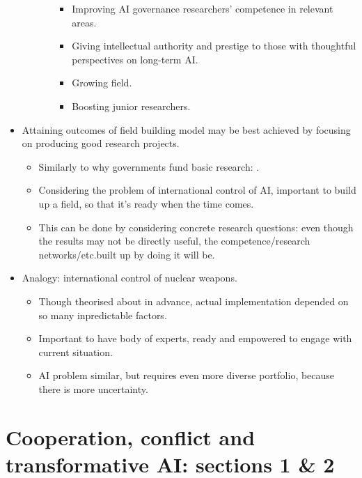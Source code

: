 \begin{itemize}
\begin{itemize}
\begin{itemize}
\begin{itemize}
                \item Improving AI governance researchers' competence in relevant areas.
                \item Giving intellectual authority and prestige to those with thoughtful perspectives on long-term AI.
                \item Growing field.
                \item Boosting junior researchers.
            \end{itemize}
        \end{itemize}
    \end{itemize}
    \item Attaining outcomes of field building model may be best achieved by focusing on producing good research projects.
    \begin{itemize}
        \item Similarly to why governments fund basic research: .
        \item Considering the problem of international control of AI, important to build up a field, so that it's ready when the time comes.
        \item This can be done by considering concrete research questions: even though the results may not be directly useful, the competence/research networks/etc.\@ built up by doing it will be.
    \end{itemize}
    \item Analogy: international control of nuclear weapons.
    \begin{itemize}
        \item Though theorised about in advance, actual implementation depended on so many inpredictable factors.
        \item Important to have body of experts, ready and empowered to engage with current situation.
        \item AI problem similar, but requires even more diverse portfolio, because there is more uncertainty.
    \end{itemize}
\end{itemize}


\section{Cooperation, conflict and transformative AI: sections 1 \& 2}

